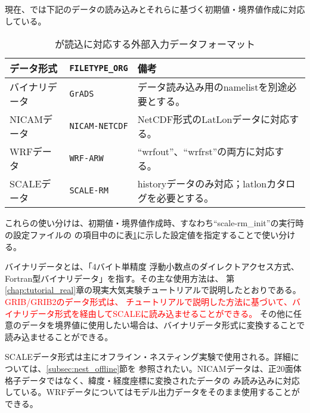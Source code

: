 \section{\SecAdvanceInputDataSetting} \label{sec:adv_datainput}

現在、\scalerm では下記のデータの読み込みとそれらに基づく初期値・境界値作成に対応している。

\begin{table}[htb]
\begin{center}
\caption{\scalelib が読込に対応する外部入力データフォーマット}
\begin{tabularx}{150mm}{|l|l|X|} \hline
 \rowcolor[gray]{0.9} データ形式 & \verb|FILETYPE_ORG| & 備考 \\ \hline
 バイナリデータ & \verb|GrADS| & データ読み込み用のnamelistを別途必要とする。 \\ \hline
 NICAMデータ &  \verb|NICAM-NETCDF| & NetCDF形式のLatLonデータに対応する。 \\ \hline
 WRFデータ &  \verb|WRF-ARW| & ``wrfout''、``wrfrst''の両方に対応する。 \\ \hline
 SCALEデータ &  \verb|SCALE-RM| & historyデータのみ対応；latlonカタログを必要とする。 \\ \hline
\end{tabularx}
\label{tab:inputdata_format}
\end{center}
\end{table}

これらの使い分けは、初期値・境界値作成時、すなわち``scale-rm\_init''の実行時の設定ファイルの
の項目中のに表\ref{tab:inputdata_format}に示した設定値を指定することで使い分ける。

バイナリデータとは、「4バイト単精度
浮動小数点のダイレクトアクセス方式、Fortran型バイナリデータ」を指す。その主な使用方法は、
第\ref{chap:tutorial_real}章の現実大気実験チュートリアルで説明したとおりである。\textcolor{red}{GRIB/GRIB2のデータ形式は、
チュートリアルで説明した方法に基づいて、バイナリデータ形式を経由してSCALEに読み込ませることができる。}
その他に任意のデータを境界値に使用したい場合は、バイナリデータ形式に変換することで読み込ませることができる。

SCALEデータ形式は主にオフライン・ネスティング実験で使用される。詳細については、\ref{subsec:nest_offline}節を
参照されたい。NICAMデータは、正20面体格子データではなく、緯度・経度座標に変換されたデータの
み読み込みに対応している。WRFデータについてはモデル出力データをそのまま使用することができる。


